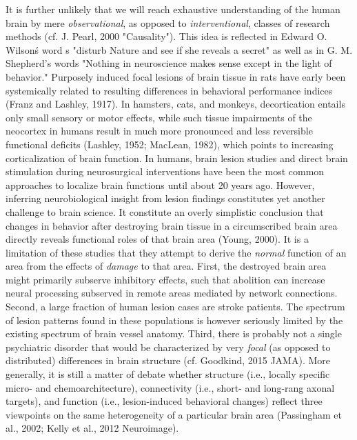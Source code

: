 \documentclass[authoryear,review,3p]{elsarticle}
\begin{document}
It is further unlikely that we
will reach exhaustive understanding of
the human brain by mere
\textit{observational}, as opposed to \textit{interventional},
classes of research methods
(cf. J. Pearl, 2000 "Causality").
This idea is reflected in
Edward O. Wilson\'s word s
"disturb Nature and see if she reveals a secret"
as well as in
G. M. Shepherd's words
"Nothing in neuroscience makes sense except in the light of behavior."
%
Purposely induced focal lesions of brain tissue in rats have early
been systemically related to resulting differences in
behavioral performance indices
(Franz and Lashley, 1917).
In hamsters, cats, and monkeys,
decortication entails only small sensory or motor effects,
while such tissue impairments of the neocortex in humans
result in much more pronounced and less reversible 
functional deficits
(Lashley, 1952; MacLean, 1982),
which points to increasing corticalization of brain function.
In humans, brain lesion studies and direct brain stimulation during
neurosurgical interventions have been
the most common approaches
to localize brain functions
until about 20 years ago.
%
However, inferring neurobiological insight from lesion findings constitutes
yet another challenge to brain science.
It constitute an overly simplistic conclusion that
changes in behavior after destroying brain tissue in a
circumscribed brain area directly reveals functional roles
of that brain area (Young, 2000).
It is a limitation of these studies that
they attempt to derive the \textit{normal} function of
an area from the effects of \textit{damage} to that area.
%
First,
the destroyed brain area might  primarily subserve inhibitory effects,
such that abolition can increase neural processing subserved in remote areas
mediated by network connections.
Second,
a large fraction of human lesion cases are stroke patients.
The spectrum of lesion patterns found in these populations
is however seriously limited by the existing spectrum of
brain vessel anatomy.
Third,
there is probably not a single psychiatric disorder that would be
characterized by very \textit{focal} (as opposed to distributed)
differences in brain structure
(cf. Goodkind, 2015 JAMA).
%
More generally, it is still a matter of debate whether
structure (i.e., locally specific micro- and chemoarchitecture),
connectivity (i.e., short- and long-rang axonal targets),
and function (i.e., lesion-induced behavioral changes)
reflect three  viewpoints on the same heterogeneity of
a particular brain area
(Passingham et al., 2002; Kelly et al., 2012 Neuroimage).
\end{document}
